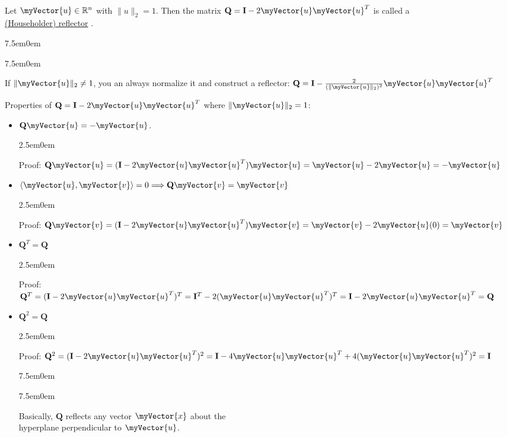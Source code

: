 \documentclass{book}
\newcommand{\hThree}{%
   \color{PineGreen}
   \fontsize{13}{15}\selectfont%
}
\newcommand{\hFour}{%
   \color{Cerulean}
   \fontsize{12}{14}\selectfont%
}
\newcommand{\teachComment}{
   \color{Orange}%
   \fontsize{12}{14}\selectfont%
}
\newenvironment{myIndent}{%
   \begin{adjustwidth}{2.5em}{0em}%
}{%
   \end{adjustwidth}%
}
\newenvironment{myTindent}{%
   \begin{adjustwidth}{7.5em}{0em}%
}{%
   \end{adjustwidth}%
}
\newcommand{\udefine}[1]{%
   {\setulcolor{Red}%
   \setul{0.14em}{0.07em}%
   \ul{#1}}%
}
\newcommand{\mySepTwo}[1][.]{%
   {\noindent\color{#1}{\rule{6.5in}{0.5mm}}}\\%
}
\newcommand{\retTwo}{\hfill\bigbreak}
\newcommand{\mVec}[1]{\myVector{#1}}
\newcommand{\mMat}[1]{\mathbf{#1}}
\begin{document}
   \mySepTwo

   Let $\mVec{u} \in \mathbb{R}^n$ with $\|u\|_2 = 1$. Then the matrix $\mMat{Q} = \mMat{I} - 2\mVec{u}\mVec{u}^T$ is called a\\ \udefine{(Householder) reflector}.
   
   {\begin{myTindent}\begin{myTindent} \teachComment
      If $\|\mVec{u}\|_2 \neq 1$, you an always normalize it and construct a reflector: $\mMat{Q} = \mMat{I} - \frac{2}{(\|\mVec{u}\|_2)^2}\mVec{u}\mVec{u}^T$ \\
   \end{myTindent}\end{myTindent}}

   Properties of $\mMat{Q} = \mMat{I} - 2\mVec{u}\mVec{u}^T$ where $\|\mVec{u}\|_2 = 1$:
   
   \begin{itemize}
      \item $\mMat{Q}\mVec{u} = -\mVec{u}$.
      {\begin{myIndent} \hThree
         Proof: $\mMat{Q}\mVec{u} = (\mMat{I} - 2\mVec{u}\mVec{u}^T)\mVec{u} = \mVec{u} - 2\mVec{u} = -\mVec{u}$
      \end{myIndent}}

      \item $\langle \mVec{u}, \mVec{v} \rangle = 0 \Longrightarrow \mMat{Q}\mVec{v} = \mVec{v}$
      {\begin{myIndent} \hThree
         Proof: $\mMat{Q}\mVec{v} = (\mMat{I} - 2\mVec{u}\mVec{u}^T)\mVec{v} = \mVec{v} - 2\mVec{u}(0) = \mVec{v}$
      \end{myIndent}}

      \item $\mMat{Q}^T = \mMat{Q}$
      {\begin{myIndent} \hThree
         Proof: $\mMat{Q}^T = (\mMat{I} - 2\mVec{u}\mVec{u}^T)^T = \mMat{I}^T - 2(\mVec{u}\mVec{u}^T)^T = \mMat{I} - 2\mVec{u}\mVec{u}^T = \mMat{Q}$
      \end{myIndent}}

      \item $\mMat{Q}^2 = \mMat{Q}$
      {\begin{myIndent} \hThree
         Proof: ${\mMat{Q}^2 = (\mMat{I} - 2\mVec{u}\mVec{u}^T)^2 = \mMat{I} - 4\mVec{u}\mVec{u}^T + 4(\mVec{u}\mVec{u}^T)^2 = \mMat{I}}$
      \end{myIndent}}

      
      {\begin{myTindent}\begin{myTindent} \hFour
         Basically, $\mMat{Q}$ reflects any vector $\mVec{x}$ about the\\ hyperplane perpendicular to $\mVec{u}$. \retTwo
      \end{myTindent}\end{myTindent}}
   \end{itemize}
\end{document}
